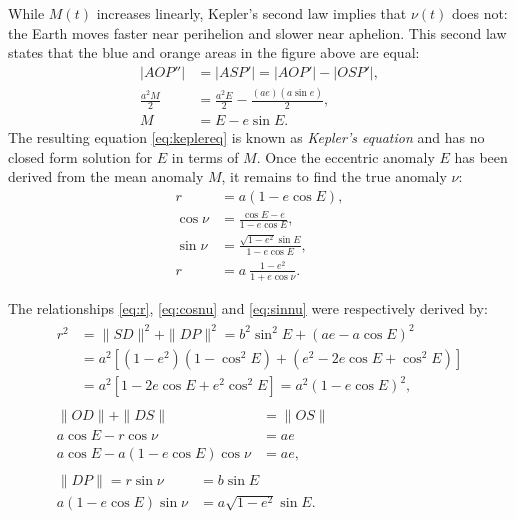 \documentclass[12pt]{article}
\begin{document}
While $M(t)$ increases linearly, Kepler's second law implies that $\nu(t)$ does not: 
the Earth moves faster near perihelion and slower near aphelion. 
This second law states that the blue and orange areas in the figure above 
are equal:
\begin{align}
    |AOP''| &= |ASP'| = |AOP'| - |OSP'|,\\
    \frac{a^2 M}{2} &= \frac{a^2 E}{2} - \frac{(ae) (a\sin e)}{2},\\
    M &= E - e \sin E \label{eq:keplereq}.
\end{align}
The resulting equation \eqref{eq:keplereq} is known as \textit{Kepler's equation} 
and has no closed form solution for $E$ in terms of $M$. Once the eccentric 
anomaly $E$ has been derived from the mean anomaly $M$, it remains to find the 
true anomaly $\nu$:
\begin{align}
    r &= a(1-e \cos E), \label{eq:r}\\[6pt]
    \cos \nu &= \frac{\cos E - e}{1 - e \cos E}, \label{eq:cosnu}\\[0pt]
    \sin \nu &= \frac{\sqrt{1-e^2} \sin E}{1-e\cos E}, \label{eq:sinnu}\\
    r &= a\: \frac{1-e^2}{1+e \cos \nu}.
\end{align}

The relationships \eqref{eq:r}, \eqref{eq:cosnu} and \eqref{eq:sinnu} 
were respectively derived by:
\begin{gather}
    \begin{aligned}
        r^2 &= \|SD\|^2+ \|DP\|^2 = b^2 \sin^2 E + (ae - a \cos E)^2\\
        &= a^2 \left[(1-e^2) (1-\cos^2 E) + (e^2 - 2e \cos E + \cos^2 E)\right]\\
        &= a^2 \left[ 1 - 2e \cos E + e^2 \cos^2 E\right] = a^2 (1-e \cos E)^2,
    \end{aligned}\\[6pt]
    \begin{aligned}
        \|OD\| + \|DS\| &= \|OS\|\\
        a \cos E - r \cos \nu &= ae\\
        a \cos E - a (1-e \cos E) \cos \nu &= ae,
    \end{aligned}\\[6pt]
    \begin{aligned}
        \|DP\| = r \sin \nu &= b \sin E\\
        a(1-e\cos E) \sin \nu &= a\sqrt{1-e^2} \sin E.
    \end{aligned}
\end{gather}
\end{document}
